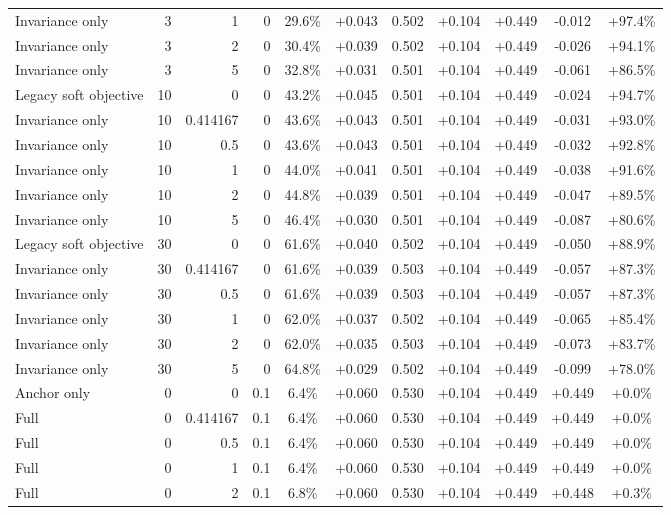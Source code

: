 \begin{table}[htbp]
\begin{tabular}{lrrrccccccc}
Invariance only & 3 & 1 & 0 & 29.6\% & +0.043 & 0.502 & +0.104 & +0.449 & -0.012 & +97.4\% \\
Invariance only & 3 & 2 & 0 & 30.4\% & +0.039 & 0.502 & +0.104 & +0.449 & -0.026 & +94.1\% \\
Invariance only & 3 & 5 & 0 & 32.8\% & +0.031 & 0.501 & +0.104 & +0.449 & -0.061 & +86.5\% \\
Legacy soft objective & 10 & 0 & 0 & 43.2\% & +0.045 & 0.501 & +0.104 & +0.449 & -0.024 & +94.7\% \\
Invariance only & 10 & 0.414167 & 0 & 43.6\% & +0.043 & 0.501 & +0.104 & +0.449 & -0.031 & +93.0\% \\
Invariance only & 10 & 0.5 & 0 & 43.6\% & +0.043 & 0.501 & +0.104 & +0.449 & -0.032 & +92.8\% \\
Invariance only & 10 & 1 & 0 & 44.0\% & +0.041 & 0.501 & +0.104 & +0.449 & -0.038 & +91.6\% \\
Invariance only & 10 & 2 & 0 & 44.8\% & +0.039 & 0.501 & +0.104 & +0.449 & -0.047 & +89.5\% \\
Invariance only & 10 & 5 & 0 & 46.4\% & +0.030 & 0.501 & +0.104 & +0.449 & -0.087 & +80.6\% \\
Legacy soft objective & 30 & 0 & 0 & 61.6\% & +0.040 & 0.502 & +0.104 & +0.449 & -0.050 & +88.9\% \\
Invariance only & 30 & 0.414167 & 0 & 61.6\% & +0.039 & 0.503 & +0.104 & +0.449 & -0.057 & +87.3\% \\
Invariance only & 30 & 0.5 & 0 & 61.6\% & +0.039 & 0.503 & +0.104 & +0.449 & -0.057 & +87.3\% \\
Invariance only & 30 & 1 & 0 & 62.0\% & +0.037 & 0.502 & +0.104 & +0.449 & -0.065 & +85.4\% \\
Invariance only & 30 & 2 & 0 & 62.0\% & +0.035 & 0.503 & +0.104 & +0.449 & -0.073 & +83.7\% \\
Invariance only & 30 & 5 & 0 & 64.8\% & +0.029 & 0.502 & +0.104 & +0.449 & -0.099 & +78.0\% \\
Anchor only & 0 & 0 & 0.1 & 6.4\% & +0.060 & 0.530 & +0.104 & +0.449 & +0.449 & +0.0\% \\
Full & 0 & 0.414167 & 0.1 & 6.4\% & +0.060 & 0.530 & +0.104 & +0.449 & +0.449 & +0.0\% \\
Full & 0 & 0.5 & 0.1 & 6.4\% & +0.060 & 0.530 & +0.104 & +0.449 & +0.449 & +0.0\% \\
Full & 0 & 1 & 0.1 & 6.4\% & +0.060 & 0.530 & +0.104 & +0.449 & +0.449 & +0.0\% \\
Full & 0 & 2 & 0.1 & 6.8\% & +0.060 & 0.530 & +0.104 & +0.449 & +0.448 & +0.3\% \\

\end{tabular}
\end{table}
